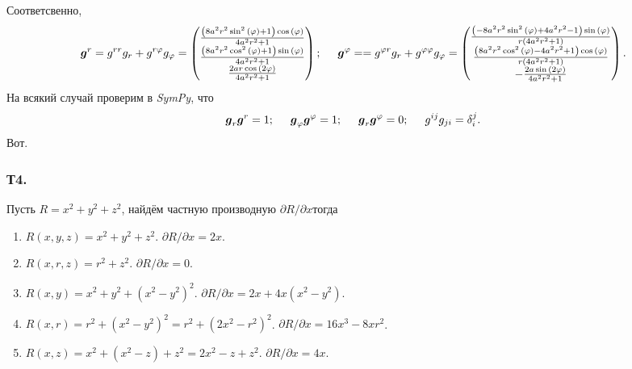 Соответсвенно,
$$
    \mbox{\boldmath $g$}^r = g^{rr} g_{r} + g^{r\varphi} g_{\varphi} = 
    \begin{pmatrix}\frac{\left(8 a^{2} r^{2} \sin^{2}{\left(\varphi \right)} + 1\right) \cos{\left(\varphi \right)}}{4 a^{2} r^{2} + 1}\\\frac{\left(8 a^{2} r^{2} \cos^{2}{\left(\varphi \right)} + 1\right) \sin{\left(\varphi \right)}}{4 a^{2} r^{2} + 1}\\\frac{2 a r \cos{\left(2 \varphi \right)}}{4 a^{2} r^{2} + 1}\end{pmatrix};
    \hspace{0.5cm} 
    \mbox{\boldmath $g$}^{\varphi} = = g^{\varphi r} g_{r} + g^{\varphi \varphi} g_{\varphi} =
    \begin{pmatrix}\frac{\left(- 8 a^{2} r^{2} \sin^{2}{\left(\varphi \right)} + 4 a^{2} r^{2} - 1\right) \sin{\left(\varphi \right)}}{r \left(4 a^{2} r^{2} + 1\right)}\\\frac{\left(8 a^{2} r^{2} \cos^{2}{\left(\varphi \right)} - 4 a^{2} r^{2} + 1\right) \cos{\left(\varphi \right)}}{r \left(4 a^{2} r^{2} + 1\right)}\\- \frac{2 a \sin{\left(2 \varphi \right)}}{4 a^{2} r^{2} + 1}\end{pmatrix}.
$$
На всякий случай проверим в \textit{SymPy}, что
$$
    \mbox{\boldmath $g$}_r \mbox{\boldmath $g$}^r = 1; \hspace{0.5cm} 
    \mbox{\boldmath $g$}_\varphi \mbox{\boldmath $g$}^{\varphi} = 1; \hspace{0.5cm} 
    \mbox{\boldmath $g$}_r \mbox{\boldmath $g$}^{\varphi} = 0; \hspace{0.5cm} 
    g^{ij} g_{ji} = \delta_i^j.
$$
Вот.

\subsubsection*{Т4.} %

Пусть $R = x^2 + y^2 + z^2$, найдём частную производную $\partial R / \partial x$тогда
\begin{enumerate}
    \item $R(x, y, z) = x^2 + y^2 + z^2$. \hfill
        $\partial R / \partial x = 2x$.
    \item $R(x, r, z) = r^2 + z^2$. \hfill
        $\partial R / \partial x = 0$. 
    \item $R(x, y) = x^2 + y^2 + (x^2 - y^2)^2$. \hfill
        $\partial R / \partial x = 2x + 4x(x^2-y^2)$.
    \item $R(x, r) = r^2 + (x^2 - y^2)^2 = r^2 + (2x^2 - r^2)^2$. \hfill
        $\partial R / \partial x = 16x^3 - 8xr^2$.
    \item $R(x, z) = x^2 + (x^2-z) + z^2 = 2x^2 - z + z^2$.\hfill
        $\partial R / \partial x = 4x$.
\end{enumerate}


